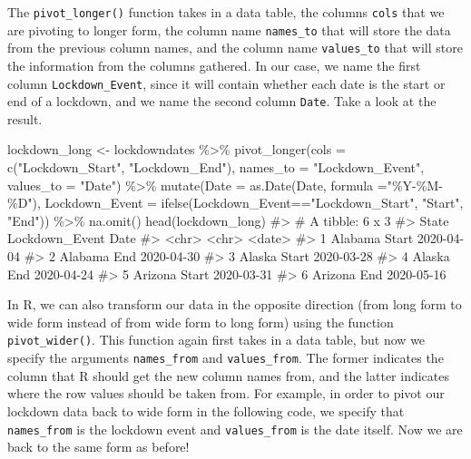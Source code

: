 \documentclass[
  letterpaper,
]{latex/krantz}
\makeatletter
\newenvironment{Shaded}{\begin{snugshade}}{\end{snugshade}}
\newcommand{\AttributeTok}[1]{\textcolor[rgb]{0.40,0.45,0.13}{#1}}
\newcommand{\CommentTok}[1]{\textcolor[rgb]{0.37,0.37,0.37}{#1}}
\newcommand{\FunctionTok}[1]{\textcolor[rgb]{0.28,0.35,0.67}{#1}}
\newcommand{\NormalTok}[1]{\textcolor[rgb]{0.00,0.23,0.31}{#1}}
\newcommand{\OtherTok}[1]{\textcolor[rgb]{0.00,0.23,0.31}{#1}}
\newcommand{\SpecialCharTok}[1]{\textcolor[rgb]{0.37,0.37,0.37}{#1}}
\newcommand{\StringTok}[1]{\textcolor[rgb]{0.13,0.47,0.30}{#1}}
\newenvironment{kframe}{%
\medskip{}
\setlength{\fboxsep}{.8em}
 \def\at@end@of@kframe{}%
 \ifinner\ifhmode%
  \def\at@end@of@kframe{\end{minipage}}%
  \begin{minipage}{\columnwidth}%
 \fi\fi%
 \def\FrameCommand##1{\hskip\@totalleftmargin \hskip-\fboxsep
 \colorbox{shadecolor}{##1}\hskip-\fboxsep
     \hskip-\linewidth \hskip-\@totalleftmargin \hskip\columnwidth}%
 \MakeFramed {\advance\hsize-\width
   \@totalleftmargin\z@ \linewidth\hsize
   \@setminipage}}%
 {\par\unskip\endMakeFramed%
 \at@end@of@kframe}
\renewenvironment{Shaded}{\begin{kframe}}{\end{kframe}}
\makeatother
\begin{document}
The \texttt{pivot\_longer()} function takes in a data table, the columns
\texttt{cols} that we are pivoting to longer form, the column name
\texttt{names\_to} that will store the data from the previous column
names, and the column name \texttt{values\_to} that will store the
information from the columns gathered. In our case, we name the first
column \texttt{Lockdown\_Event}, since it will contain whether each date
is the start or end of a lockdown, and we name the second column
\texttt{Date}. Take a look at the result.

\begin{Shaded}
\begin{Highlighting}[]
\NormalTok{lockdown\_long }\OtherTok{\textless{}{-}}\NormalTok{ lockdowndates }\SpecialCharTok{\%\textgreater{}\%}
  \FunctionTok{pivot\_longer}\NormalTok{(}\AttributeTok{cols =} \FunctionTok{c}\NormalTok{(}\StringTok{"Lockdown\_Start"}\NormalTok{, }\StringTok{"Lockdown\_End"}\NormalTok{), }
               \AttributeTok{names\_to =} \StringTok{"Lockdown\_Event"}\NormalTok{, }\AttributeTok{values\_to =} \StringTok{"Date"}\NormalTok{) }\SpecialCharTok{\%\textgreater{}\%}
  \FunctionTok{mutate}\NormalTok{(}\AttributeTok{Date =} \FunctionTok{as.Date}\NormalTok{(Date, }\AttributeTok{formula =}\StringTok{"\%Y{-}\%M{-}\%D"}\NormalTok{), }
         \AttributeTok{Lockdown\_Event =} \FunctionTok{ifelse}\NormalTok{(Lockdown\_Event}\SpecialCharTok{==}\StringTok{"Lockdown\_Start"}\NormalTok{, }
                                 \StringTok{"Start"}\NormalTok{, }\StringTok{"End"}\NormalTok{)) }\SpecialCharTok{\%\textgreater{}\%}
  \FunctionTok{na.omit}\NormalTok{()}
\FunctionTok{head}\NormalTok{(lockdown\_long)}
\CommentTok{\#\textgreater{} \# A tibble: 6 x 3}
\CommentTok{\#\textgreater{}   State   Lockdown\_Event Date      }
\CommentTok{\#\textgreater{}   \textless{}chr\textgreater{}   \textless{}chr\textgreater{}          \textless{}date\textgreater{}    }
\CommentTok{\#\textgreater{} 1 Alabama Start          2020{-}04{-}04}
\CommentTok{\#\textgreater{} 2 Alabama End            2020{-}04{-}30}
\CommentTok{\#\textgreater{} 3 Alaska  Start          2020{-}03{-}28}
\CommentTok{\#\textgreater{} 4 Alaska  End            2020{-}04{-}24}
\CommentTok{\#\textgreater{} 5 Arizona Start          2020{-}03{-}31}
\CommentTok{\#\textgreater{} 6 Arizona End            2020{-}05{-}16}
\end{Highlighting}
\end{Shaded}

In R, we can also transform our data in the opposite direction (from
long form to wide form instead of from wide form to long form) using the
function
\texttt{pivot\_wider()}.
This function again first takes in a data table, but now we specify the
arguments \texttt{names\_from} and \texttt{values\_from}. The former
indicates the column that R should get the new column names from, and
the latter indicates where the row values should be taken from. For
example, in order to pivot our lockdown data back to wide form in the
following code, we specify that \texttt{names\_from} is the lockdown
event and \texttt{values\_from} is the date itself. Now we are back to
the same form as before!
\end{document}
